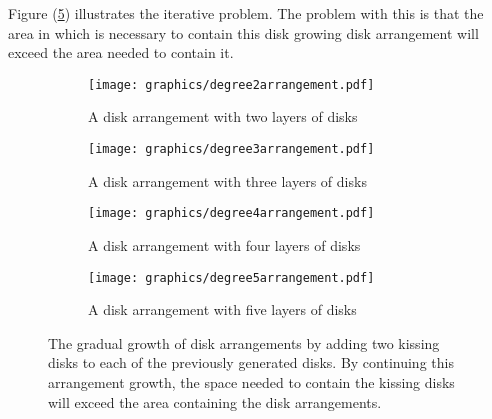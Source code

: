 Figure (\ref{fig:circlePacking-1}) illustrates the iterative problem.  The problem with this is that 
the area in
which is necessary to contain this disk growing disk arrangement will exceed the area needed to 
contain it.
\begin{figure}[H]
\begin{center}
  \begin{subfigure}[b]{0.24\textwidth}
	  \texttt{[image: graphics/degree2arrangement.pdf]}
	  \caption{A disk arrangement with two layers of disks}
	  \label{fig:circlePacking1-1}
  \end{subfigure}
  \begin{subfigure}[b]{0.24\textwidth}
	  \texttt{[image: graphics/degree3arrangement.pdf]}
	  \caption{A disk arrangement with three layers of disks}
	  \label{fig:circlePacking1-2}
  \end{subfigure}
  \begin{subfigure}[b]{0.24\textwidth}
	  \texttt{[image: graphics/degree4arrangement.pdf]}
	  \caption{A disk arrangement with four layers of disks}
	  \label{fig:circlePacking1-3}
  \end{subfigure}
  \begin{subfigure}[b]{0.24\textwidth}
	  \texttt{[image: graphics/degree5arrangement.pdf]}
	  \caption{A disk arrangement with five layers of disks}
	  \label{fig:circlePacking1-3}
  \end{subfigure}
\end{center} 
\caption{The gradual growth of disk arrangements by adding two kissing disks to each of the 
previously generated disks.  By continuing this arrangement growth, the space needed to contain the 
kissing disks will exceed the area containing the disk arrangements.}\label{fig:circlePacking-1}
\end{figure}



